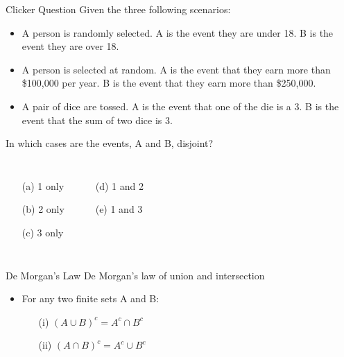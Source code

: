 \documentclass{beamer}
\begin{document}
\begin{frame}{Clicker Question}
	Given the three following scenarios:
	\begin{itemize}
		\item A person is randomly selected. A is the event they are under 18. B is the event they are over 18.
		\item A person is selected at random. A is the event that they earn more than \$100,000 per year. B is the event that they earn more than \$250,000.
		\item A pair of dice are tossed. A is the event that one of the die is a 3. B is the event that the sum of two dice is 3.
	\end{itemize}
	\vspace{.2cm}
	In which cases are the events, A and B, disjoint?
	\begin{center}
		\begin{columns}
			\begin{itemize}
				\item[(a)] 1 only
				\item[(b)] 2 only
				\item[(c)] 3 only
			\end{itemize}
			\begin{itemize}
				\item[(d)] 1 and 2
				\item[(e)] 1 and 3
			\end{itemize}
		\end{columns}
	\end{center}
\end{frame}



\begin{frame}{De Morgan's Law}
	De Morgan's law of  union and intersection
	\begin{itemize} 
		\item For any two finite sets A and B:
		      \begin{itemize}
		      	\item[(i)] $(A \cup B)^c = A^c \cap B^c$
		      	\item[(ii)] $(A \cap B)^c = A^c \cup B^c$
		      \end{itemize}
	\end{itemize}
	
\end{frame}
\end{document}
